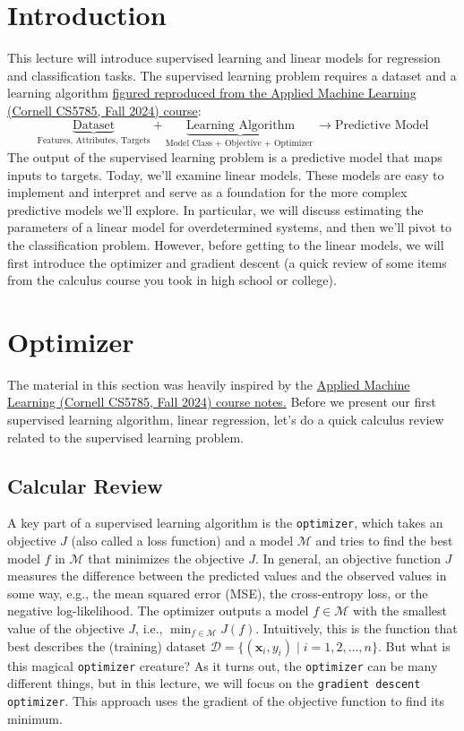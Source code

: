 \documentclass{article}[11pt]
\begin{document}
\section{Introduction}
This lecture will introduce supervised learning and linear models for regression and classification tasks.
The supervised learning problem requires a dataset and a learning algorithm \href{https://github.com/kuleshov/cornell-cs5785-2024-applied-ml}{figured reproduced from the Applied Machine Learning (Cornell CS5785, Fall 2024) course}:
\begin{equation*}
\underbrace{\text{Dataset}}_\text{Features, Attributes, Targets} + \underbrace{\text{Learning Algorithm}}_\text{Model Class + Objective + Optimizer } \to \text{Predictive Model}
\end{equation*}
The output of the supervised learning problem is a predictive model that maps inputs to targets. 
Today, we'll examine linear models. These models are easy to implement and interpret and serve as a foundation for the more complex predictive models we'll explore.
In particular, we will discuss estimating the parameters of a linear model for overdetermined systems, and then we'll pivot to the classification problem. However, before getting to the linear models, we will first introduce the optimizer and gradient descent (a quick review of some items from the calculus course you took in high school or college).

\section{Optimizer}
The material in this section was heavily inspired by the \href{https://github.com/kuleshov/cornell-cs5785-2024-applied-ml}{Applied Machine Learning (Cornell CS5785, Fall 2024) course notes.} Before we present our first supervised learning algorithm, linear regression, let's do a quick calculus review related to the supervised learning problem. 

\subsection{Calcular Review}
A key part of a supervised learning algorithm is the \texttt{optimizer}, which takes  
an objective $J$ (also called a loss function) and a model $\mathcal{M}$ and tries to find the best model $f$ in $\mathcal{M}$ that minimizes the objective $J$. In general, an objective function $J$ measures the difference between the predicted values and the observed values in some way, e.g., the mean squared error (MSE), the cross-entropy loss, or the negative log-likelihood.
The optimizer outputs a model $f \in \mathcal{M}$ with the smallest value of the objective $J$, i.e., $\min_{f \in \mathcal{M}} J(f)$. Intuitively, this is the function that best describes the (training) dataset
$\mathcal{D} = \{(\mathbf{x}_{i}, y_{i}) \mid i = 1,2,\dots,n\}$. But what is this magical \texttt{optimizer} creature?
As it turns out, the \texttt{optimizer} can be many different things, but in this lecture, we will focus on the \texttt{gradient descent optimizer}. This approach uses the gradient of the objective function to find its minimum.
\end{document}

